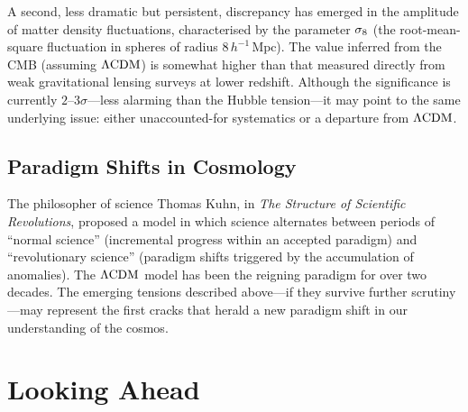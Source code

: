 A second, less dramatic but persistent, discrepancy has emerged in the amplitude of matter density fluctuations, characterised by the parameter $\sigma_8$ (the root-mean-square fluctuation in spheres of radius $8\,h^{-1}\,\mathrm{Mpc}$). The value inferred from the CMB (assuming $\Lambda\mathrm{CDM}$) is somewhat higher than that measured directly from weak gravitational lensing surveys at lower redshift. Although the significance is currently $2$--$3\sigma$---less alarming than the Hubble tension---it may point to the same underlying issue: either unaccounted-for systematics or a departure from $\Lambda\mathrm{CDM}$.


\subsection{Paradigm Shifts in Cosmology}

The philosopher of science Thomas Kuhn, in \textit{The Structure of Scientific Revolutions}, proposed a model in which science alternates between periods of ``normal science'' (incremental progress within an accepted paradigm) and ``revolutionary science'' (paradigm shifts triggered by the accumulation of anomalies). The $\Lambda\mathrm{CDM}$ model has been the reigning paradigm for over two decades. The emerging tensions described above---if they survive further scrutiny---may represent the first cracks that herald a new paradigm shift in our understanding of the cosmos.


\section{Looking Ahead}
\label{sec:looking_ahead}

